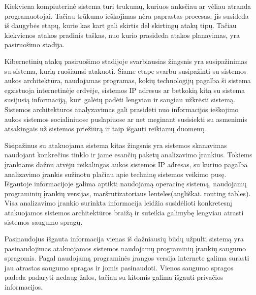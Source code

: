 Kiekviena kompiuterinė sistema turi trukumų, kuriuos anksčiau ar vėliau atranda programuotojai. Tačiau trūkumo ieškojimas nėra paprastas procesas, jis susideda iš daugybės etapų, kurie kas kart gali skirtis dėl skirtingų atakų tipų. Tačiau kiekvienos atakos pradinis taškas, nuo kurio prasideda atakos planavimas, yra pasiruošimo stadija.

Kibernetinių atakų pasiruošimo stadijoje svarbiausias žingsnis yra susipažinimas su sistema, kurią ruošiamsi atakuoti. Šiame etape svarbu susipažinti su sistemos aukos architektūra, naudojamas programas, kokių technologijų pagalba ši sistema egzistuoja internetinėje erdvėje, sistemos IP adresus ar betkokią kitą su sistema susijusią informaciją, kuri galėtų padėti lengviau ir saugiau užkrėsti sistemą. Sistemos architektūros analyzavimas gali prasidėti nuo informacijos ieškojimo aukos sistemos socialiniuose puslapiuose ar net meginant susisiekti su asmenimis atsakingais už sistemos priežiūrą ir taip išgauti reikiamų duomenų.

Sisipažinus su atakuojama sistema kitas žingsnis yra sistemos skanavimas naudojant konkrečius tinklo ir jame esančių paketų analizavimo įrankius. Tokiems įrankiams dažnu atvėju reikalingas aukos sistemos IP adresas, su kuriuo pagalba analizavimo įrankis sužinotu plačiau apie techninę sistemos veikimo pusę. Išgautoje informacijoje galima aptikti naudojamą operacinę sistemą, naudojamų programinių įrankių versijas, maršrutizatoriaus lenteles(angliškai. routing tables). Visa analizavimo įrankio surinkta informacija leidžia susidėlioti konkretesnį atakuojamos sistemos architektūros braižą ir suteikia galimybę lengviau atrasti sistemos saugumo spragų.

Pasinaudojus išgauta informacija vienas iš dažniausių būdų užpulti sistemą yra pasinaudojimas atakuojamos sistemos naudojamų programinių įrankių saugumo spragomis. Pagal naudojamą programinės įrangos versija internete galima surasti jau atrastas saugumo spragas ir jomis pasinaudoti. Vienos saugumo spragos padeda padaryti nedaug žalos, tačiau su kitomis galima išgauti privačios informacijos.
